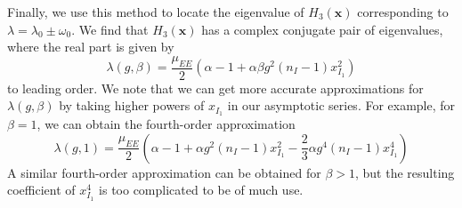 \documentclass[11pt,reqno]{amsart}
\newcommand{\xvec}{\mathbf{x}}
\begin{document}
Finally, we use this method to locate the eigenvalue of $H_3(\xvec)$ corresponding to $\lambda = \lambda_0 \pm \omega_0$. We find that $H_3(\xvec)$ has a complex conjugate pair of eigenvalues, where the real part is given by
\begin{equation}
\lambda(g, \beta) = \frac{\mu_{EE}}{2}\left( \alpha - 1 + \alpha \beta g^2 (n_I-1) x_{I_1}^2 \right)
\end{equation}
to leading order. We note that we can get more accurate approximations for $\lambda(g, \beta)$ by taking higher powers of $x_{I_1}$ in our asymptotic series. For example, for $\beta=1$, we can obtain the fourth-order approximation
\[
\lambda(g, 1) = \frac{\mu_{EE}}{2}\left( \alpha - 1 + \alpha g^2 (n_I-1) x_{I_1}^2 - \frac{2}{3}\alpha g^4 (n_I-1) x_{I_1}^4 \right)
\]
A similar fourth-order approximation can be obtained for $\beta>1$, but the resulting coefficient of $x_{I_1}^4$ is too complicated to be of much use.
\end{document}
